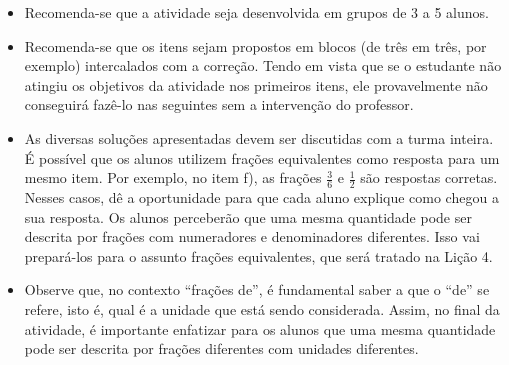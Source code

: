 \begin{multicols}{2}
\begin{orientacoes}{}{}
  \begin{itemize} %
  \item Recomenda-se que a atividade seja desenvolvida em grupos de 3 a 5 alunos.
    \item Recomenda-se que os itens sejam propostos em blocos (de três em três, por exemplo) intercalados com a correção. Tendo em vista que se o estudante não atingiu os objetivos da atividade nos primeiros itens, ele provavelmente não conseguirá fazê-lo nas seguintes sem a intervenção do professor.
    \item As diversas soluções apresentadas devem ser discutidas com a
turma inteira. É possível que os alunos utilizem frações equivalentes como
resposta para um mesmo item. Por exemplo, no item f), as frações $\frac{3}{6}$ e $\frac{1}{2}$ são respostas corretas. Nesses casos, dê a oportunidade para que cada aluno explique como chegou a sua resposta. Os alunos perceberão que uma mesma quantidade pode ser descrita por frações com numeradores e denominadores diferentes. Isso vai prepará-los para o assunto frações equivalentes, que será tratado na Lição 4.
    \item Observe que, no contexto ``frações de'', é fundamental saber a que o ``de'' se refere, isto é, qual é a unidade que está sendo considerada. Assim, no final da atividade, é importante enfatizar para os alunos que uma mesma quantidade pode ser descrita por frações diferentes com unidades diferentes.
\end{itemize} %



\end{orientacoes}
\end{multicols}

\newpage

